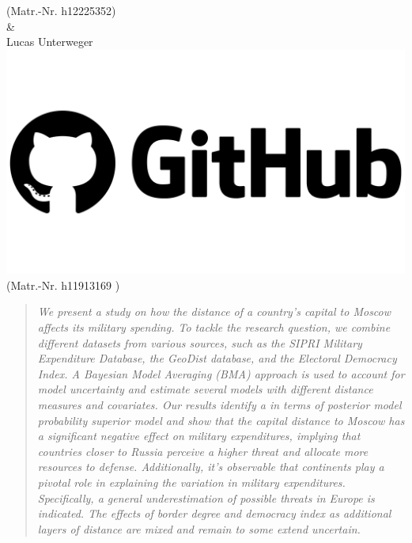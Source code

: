 \documentclass[12pt,a4paper]{article}
\begin{document}
\begin{titlepage}
(Matr.-Nr. h12225352)\\ \vspace{3mm}
\& \\ \vspace{3mm}
{\Large Lucas Unterweger \href{https://github.com/therealLucasPaul}{\includegraphics[scale=0.01]{GitHub.png}}}\\
(Matr.-Nr. h11913169 )\\ \vspace{3mm}
\vfill

\thispagestyle{empty}
\pagebreak
\end{titlepage}
\thispagestyle{empty}
\begin{abstract}
\textit{We present a study on how the distance of a country’s capital to Moscow affects its military spending. To tackle the research question, we combine different datasets from various sources, such as the SIPRI Military Expenditure Database, the GeoDist database, and the Electoral Democracy Index. A Bayesian Model Averaging (BMA) approach is used to account for model uncertainty and estimate several models with different distance measures and covariates. Our results identify a in terms of posterior model probability superior model and show that the capital distance to Moscow has a significant negative effect on military expenditures, implying that countries closer to Russia perceive a higher threat and allocate more resources to defense. Additionally, it's observable that continents play a pivotal role in explaining the variation in military expenditures. Specifically, a general underestimation of possible threats in Europe is indicated. The effects of border degree and democracy index as additional layers of distance are mixed and remain to some extend uncertain.} 
\end{abstract}
\clearpage
\thispagestyle{plain}
\tableofcontents
\pagebreak
{}
\end{document}
